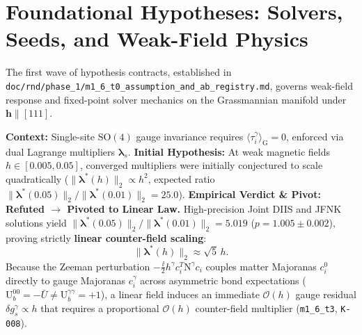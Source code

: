 \section{Foundational Hypotheses: Solvers, Seeds, and Weak-Field Physics}
\label{sec:foundational_hypotheses}

The first wave of hypothesis contracts, established in \texttt{doc/rnd/phase\_1/m1\_6\_t0\_assumption\_and\_ab\_registry.md}, governs weak-field response and fixed-point solver mechanics on the Grassmannian manifold under $\mathbf{h} \parallel [111]$.

\begin{contract}
\label{con:ph01_gauge_scaling}
\textbf{Context:} Single-site $\mathrm{SO}(4)$ gauge invariance requires $\langle \tau_i^\gamma \rangle_{\mathrm{G}} = 0$, enforced via dual Lagrange multipliers $\boldsymbol{\lambda}_s$.
\textbf{Initial Hypothesis:} At weak magnetic fields $h \in [0.005, 0.05]$, converged multipliers were initially conjectured to scale quadratically ($\|\boldsymbol{\lambda}^*(h)\|_2 \propto h^2$, expected ratio $\|\boldsymbol{\lambda}^*(0.05)\|_2 / \|\boldsymbol{\lambda}^*(0.01)\|_2 = 25.0$).
\textbf{Empirical Verdict \& Pivot:} \textbf{Refuted $\to$ Pivoted to Linear Law.} High-precision Joint DIIS and JFNK solutions yield $\|\boldsymbol{\lambda}^*(0.05)\|_2 / \|\boldsymbol{\lambda}^*(0.01)\|_2 = 5.019$ ($p = 1.005 \pm 0.002$), proving strictly \textbf{linear counter-field scaling}:
\begin{equation}
\label{eq:con_ph01_scaling}
\|\boldsymbol{\lambda}^*(h)\|_2 \approx \sqrt{5}\, h.
\end{equation}
Because the Zeeman perturbation $-\frac{\ii}{2}h^\gamma c_i^T \mathrm{N}^\gamma c_i$ couples matter Majoranas $c_i^0$ directly to gauge Majoranas $c_i^\gamma$ across asymmetric bond expectations ($\mathrm{U}_b^{00} = -\bar{U} \neq \mathrm{U}_b^{\gamma\gamma} = +1$), a linear field induces an immediate $\mathcal{O}(h)$ gauge residual $\delta g_s^\gamma \propto h$ that requires a proportional $\mathcal{O}(h)$ counter-field multiplier (\texttt{m1\_6\_t3}, \texttt{K-008}).
\end{contract}


